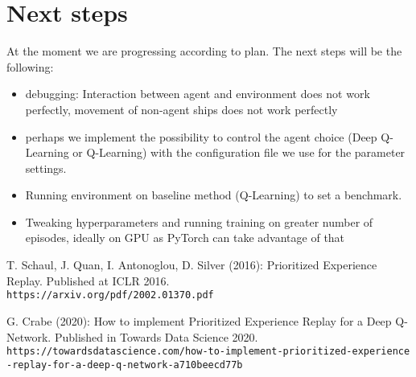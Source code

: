 \documentclass[11pt]{article} %
\begin{document}
\section{Next steps}
At the moment we are progressing according to plan. The next steps will be the following:
\begin{itemize}
	\item debugging: Interaction between agent and environment does not work perfectly, movement of non-agent ships does not work perfectly
	\item perhaps we implement the possibility to control the agent choice (Deep Q-Learning or Q-Learning) with the configuration file we use for the parameter settings.
	\item Running environment on baseline method (Q-Learning) to set a benchmark.
	\item Tweaking hyperparameters and running training on greater number of episodes, ideally on GPU as PyTorch can take advantage of that
\end{itemize}



\begin{thebibliography}{2}

T. Schaul, J. Quan, I. Antonoglou, D. Silver (2016): Prioritized Experience Replay. Published at ICLR 2016.\\
\texttt{https://arxiv.org/pdf/2002.01370.pdf}

G. Crabe (2020): 
How to implement Prioritized Experience Replay for a Deep Q-Network. Published in Towards Data Science 2020.\\
\texttt{https://towardsdatascience.com/how-to-implement-prioritized-experience\\-replay-for-a-deep-q-network-a710beecd77b}


\end{thebibliography}
\end{document}
